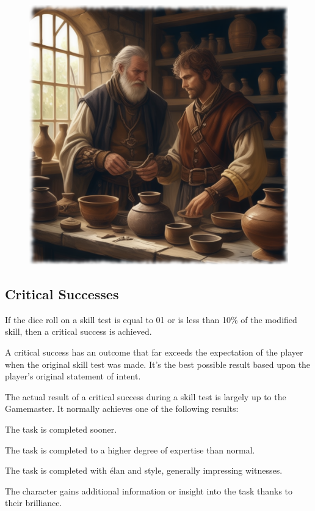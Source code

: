 \begin{figure}[h]
\begin{center}
\includegraphics[scale=0.24]{img/ai-images/potter-and-nobleman.png}
\end{center}
\end{figure}


\subsection{Critical Successes}
If the dice roll on a skill test is equal to 01 or is less than 10\% of the modified skill, then a critical success is achieved. 

A critical success has an outcome that far exceeds the expectation of the player when the original skill test was made. It’s the best possible result based upon the player’s original statement of intent.

The actual result of a critical success during a skill test is largely up to the Gamemaster. It normally achieves one of the following results: 

\begin{rpg-list}
\item The task is completed sooner. 
\item The task is completed to a higher degree of expertise than normal. 
\item The task is completed with élan and style, generally impressing witnesses. 
\item The character gains additional information or insight into the task thanks to their brilliance. 
\end{rpg-list}

